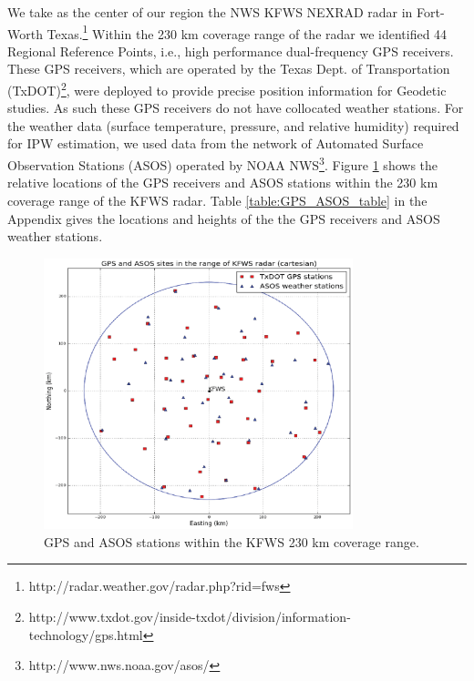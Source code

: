 \documentclass[proposal]{umassthesis}
\begin{document}
We take as the center of our region the NWS KFWS NEXRAD radar in Fort-Worth Texas.\footnote{http://radar.weather.gov/radar.php?rid=fws} Within the 230 km coverage range of the radar we identified 44 Regional Reference Points, i.e., high performance dual-frequency GPS receivers. These GPS receivers, which are operated by the Texas Dept. of Transportation (TxDOT)\footnote{http://www.txdot.gov/inside-txdot/division/information-technology/gps.html}, were deployed to provide precise position information for Geodetic studies. As such these GPS receivers do not have collocated weather stations. For the weather data (surface temperature, pressure, and relative humidity) required for IPW estimation, we used data from the network of Automated Surface Observation Stations (ASOS) operated by NOAA NWS\footnote{http://www.nws.noaa.gov/asos/}. Figure \ref{fig:GPS_ASOS_Loc} shows the relative locations of the GPS receivers and ASOS stations within the 230 km coverage range of the KFWS radar. Table \ref{table:GPS_ASOS_table} in the Appendix gives the locations and heights of the the GPS receivers and ASOS weather stations.
\begin{figure}[!t]
\begin{center}
\includegraphics[width = 0.8\textwidth]{GPS_ASOS_Locations.eps}
\caption{GPS and ASOS stations within the KFWS 230 km coverage range.}
\label{fig:GPS_ASOS_Loc}
\end{center}
\end{figure}
\end{document}
